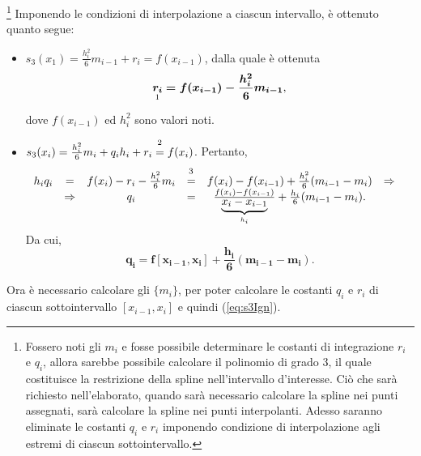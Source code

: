\noindent\footnote{Fossero noti gli $m_i$ e fosse possibile determinare le costanti di integrazione $r_i$ e $q_i$, allora sarebbe possibile calcolare il polinomio di grado 3, il quale costituisce la restrizione della spline nell'intervallo d'interesse. Ciò che sarà richiesto nell'elaborato, quando sarà necessario calcolare la spline nei punti assegnati, sarà calcolare la spline nei punti interpolanti. Adesso saranno eliminate le costanti $q_i$ e $r_i$ imponendo condizione di interpolazione agli estremi di ciascun sottointervallo.}
Imponendo le condizioni di interpolazione a ciascun intervallo, è ottenuto quanto segue:
\begin{itemize}
    \item $s_3(x_1)=\frac{h_i^2}{6}m_{i-1}+r_i=f(x_{i-1})$, dalla quale è ottenuta \begin{equation}\label{eq:ri}
        \underset{\footnotemark}{\boldsymbol{r_i}}\boldsymbol{=f(x_{i-1})-\frac{h_i^2}{6}m_{i-1}},
    \end{equation}
    dove $f(x_{i-1})$ ed $h_i^2$ sono valori noti.
    \item $s_3(x_i)=\frac{h_i^2}{6}m_i+q_ih_i+r_i\overset{\footnotemark}{=}f(x_i)$. Pertanto,
    \begin{equation*}
        \begin{matrix}
             h_iq_i &=& f(x_i)-r_i-\frac{h_i^2}{6}m_i &\overset{\footnotemark}{=}& f(x_i)-f(x_{i-1})+\frac{h_i^2}{6}(m_{i-1}-m_i) &\Rightarrow&\\
            &\Rightarrow& q_i &=& \frac{f(x_i)-f(x_{i-1})}{\underbrace{x_i-x_{i-1}}_{h_i}}+\frac{h_i}{6}(m_{i-1}-m_i).&&
        \end{matrix}
    \end{equation*}
    Da cui,
    \begin{equation}\label{eq:qi}
        \boldsymbol{q_i=f[x_{i-1},x_i]+\frac{h_i}{6}(m_{i-1}-m_i).}
    \end{equation}
\end{itemize}
\addtocounter{footnote}{-2}



Ora è necessario calcolare gli $\{m_i\}$, per poter calcolare le costanti $q_i$ e $r_i$ di ciascun sottointervallo $[x_{i-1},x_i]$ e quindi (\ref{eq:s3Ign}).

